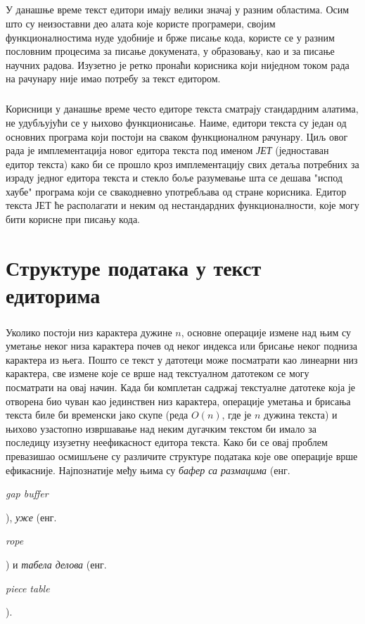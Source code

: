 \documentclass[12pt,oneside]{memoir}
\begin{document}
\paragraph{}
У данашње време текст едитори имају велики значај у разним областима.
Осим што су неизоставни део алата које користе програмери, својим
функционалностима нуде удобније и брже писање кода, користе се у разним
пословним процесима за писање докумената, у образовању, као и за писање научних радова. Изузетно је ретко пронаћи корисника који ниједном током рада на рачунару није
имао потребу за текст едитором.

\paragraph{}
Корисници у данашње време често едиторе текста сматрају стандардним алатима, не
удубљујући се у њихово функционисање. Наиме, едитори текста су један од основних
програма који постоји на сваком функционалном рачунару. Циљ овог рада је 
имплементација новог едитора текста под именом \emph{ЈЕТ} (једноставан едитор текста) 
како би се прошло кроз имплементацију свих детаља потребних за израду 
једног едитора текста и стекло боље разумевање шта се дешава "испод хаубе" програма
који се свакодневно употребљава од стране корисника. Едитор текста ЈЕТ ће располагати
и неким од нестандардних функционалности, које могу бити корисне при писању кода.

\chapter{Структуре података у текст едиторима}
\paragraph{}
Уколико постоји низ карактера дужине \(n\), основне операције измене над њим су 
уметање неког низа карактера почев од неког индекса или брисање неког подниза карактера из њега.
Пошто се текст у датотеци може посматрати као линеарни низ карактера, све измене које
се врше над текстуалном датотеком се могу посматрати на овај начин. 
Када би комплетан садржај текстуалне датотеке која је отворена био чуван као јединствен
низ карактера, операције уметања и брисања текста биле би временски јако скупе (реда
\(O(n)\), где је \(n\) дужина текста) и њихово узастопно извршавање над неким дугачким
текстом би имало за последицу изузетну неефикасност едитора текста. Како би се овај 
проблем превазишао осмишљене су различите структуре података које ове операције
врше ефикасније. Најпознатије међу њима су \emph{бафер са размацима}
(енг. \begin{latinica}\textit{gap buffer}\end{latinica}), \emph{уже} (енг. 
\begin{latinica}\textit{rope}\end{latinica}) и \emph{табела делова} (енг. 
\begin{latinica}\textit{piece table}\end{latinica}).
\end{document}

